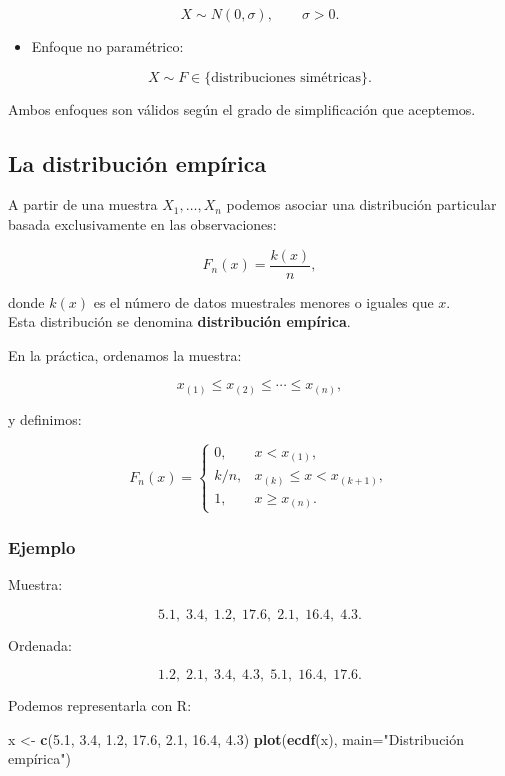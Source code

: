 \documentclass[
]{article}
\newenvironment{Shaded}{\begin{snugshade}}{\end{snugshade}}
\newcommand{\AttributeTok}[1]{\textcolor[rgb]{0.13,0.29,0.53}{#1}}
\newcommand{\FloatTok}[1]{\textcolor[rgb]{0.00,0.00,0.81}{#1}}
\newcommand{\FunctionTok}[1]{\textcolor[rgb]{0.13,0.29,0.53}{\textbf{#1}}}
\newcommand{\NormalTok}[1]{#1}
\newcommand{\OtherTok}[1]{\textcolor[rgb]{0.56,0.35,0.01}{#1}}
\newcommand{\StringTok}[1]{\textcolor[rgb]{0.31,0.60,0.02}{#1}}
\providecommand{\tightlist}{%
  \setlength{\itemsep}{0pt}\setlength{\parskip}{0pt}}
\begin{document}
\[
X\sim N(0,\sigma),\qquad \sigma>0.
\]

\begin{itemize}
\tightlist
\item
  Enfoque no paramétrico:
\end{itemize}

\[
X \sim F \in\{\text{distribuciones simétricas}\}.
\]

Ambos enfoques son válidos según el grado de simplificación que aceptemos.

\subsection{La distribución empírica}\label{la-distribuciuxf3n-empuxedrica}

A partir de una muestra \(X_1,\ldots,X_n\) podemos asociar una distribución particular basada exclusivamente en las observaciones:

\[
F_n(x) = \frac{k(x)}{n},
\]

donde \(k(x)\) es el número de datos muestrales menores o iguales que \(x\).\\
Esta distribución se denomina \textbf{distribución empírica}.

En la práctica, ordenamos la muestra:

\[
x_{(1)} \le x_{(2)} \le \cdots \le x_{(n)},
\]

y definimos:

\[
F_n(x) =
\begin{cases}
0, & x<x_{(1)},\\[4pt]
k/n, & x_{(k)} \le x < x_{(k+1)},\\[4pt]
1, & x \ge x_{(n)}.
\end{cases}
\]

\subsubsection{Ejemplo}\label{ejemplo-9}

Muestra:

\[
5.1,\; 3.4,\; 1.2,\; 17.6,\; 2.1,\; 16.4,\; 4.3.
\]

Ordenada:

\[
1.2,\; 2.1,\; 3.4,\; 4.3,\; 5.1,\; 16.4,\; 17.6.
\]

Podemos representarla con R:

\begin{Shaded}
\begin{Highlighting}[]
\NormalTok{x }\OtherTok{\textless{}{-}} \FunctionTok{c}\NormalTok{(}\FloatTok{5.1}\NormalTok{, }\FloatTok{3.4}\NormalTok{, }\FloatTok{1.2}\NormalTok{, }\FloatTok{17.6}\NormalTok{, }\FloatTok{2.1}\NormalTok{, }\FloatTok{16.4}\NormalTok{, }\FloatTok{4.3}\NormalTok{)}
\FunctionTok{plot}\NormalTok{(}\FunctionTok{ecdf}\NormalTok{(x), }\AttributeTok{main=}\StringTok{"Distribución empírica"}\NormalTok{)}
\end{Highlighting}
\end{Shaded}
\end{document}
